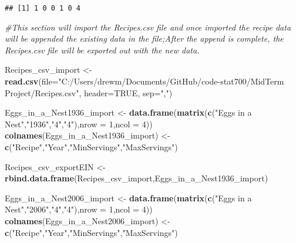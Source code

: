 \documentclass[]{article}
\newenvironment{Shaded}{\begin{snugshade}}{\end{snugshade}}
\newcommand{\KeywordTok}[1]{\textcolor[rgb]{0.13,0.29,0.53}{\textbf{#1}}}
\newcommand{\DataTypeTok}[1]{\textcolor[rgb]{0.13,0.29,0.53}{#1}}
\newcommand{\DecValTok}[1]{\textcolor[rgb]{0.00,0.00,0.81}{#1}}
\newcommand{\StringTok}[1]{\textcolor[rgb]{0.31,0.60,0.02}{#1}}
\newcommand{\CommentTok}[1]{\textcolor[rgb]{0.56,0.35,0.01}{\textit{#1}}}
\newcommand{\OtherTok}[1]{\textcolor[rgb]{0.56,0.35,0.01}{#1}}
\newcommand{\OperatorTok}[1]{\textcolor[rgb]{0.81,0.36,0.00}{\textbf{#1}}}
\newcommand{\NormalTok}[1]{#1}
\begin{document}
\begin{Shaded}
\end{Shaded}

\begin{verbatim}
## [1] 1 0 0 1 0 4
\end{verbatim}

\begin{Shaded}
\begin{Highlighting}[]
\CommentTok{#This section will import the Recipes.csv file and once imported the recipe data will be appended the existing data in the file;After the append is complete, the Recipes.csv file will be exported out with the new data.}

\NormalTok{Recipes_csv_import <-}\StringTok{ }\KeywordTok{read.csv}\NormalTok{(}\DataTypeTok{file=}\StringTok{"C:/Users/drewm/Documents/GitHub/code-stat700/MidTerm Project/Recipes.csv"}\NormalTok{, }\DataTypeTok{header=}\OtherTok{TRUE}\NormalTok{, }\DataTypeTok{sep=}\StringTok{","}\NormalTok{)}

\NormalTok{Eggs_in_a_Nest1936_import <-}\StringTok{ }\KeywordTok{data.frame}\NormalTok{(}\KeywordTok{matrix}\NormalTok{(}\KeywordTok{c}\NormalTok{(}\StringTok{"Eggs in a Nest"}\NormalTok{,}\StringTok{"1936"}\NormalTok{,}\StringTok{"4"}\NormalTok{,}\StringTok{"4"}\NormalTok{),}\DataTypeTok{nrow =} \DecValTok{1}\NormalTok{,}\DataTypeTok{ncol =} \DecValTok{4}\NormalTok{))}
\KeywordTok{colnames}\NormalTok{(Eggs_in_a_Nest1936_import) <-}\StringTok{ }\KeywordTok{c}\NormalTok{(}\StringTok{"Recipe"}\NormalTok{,}\StringTok{"Year"}\NormalTok{,}\StringTok{"MinServings"}\NormalTok{,}\StringTok{"MaxServings"}\NormalTok{)}

\NormalTok{Recipes_csv_exportEIN <-}\StringTok{ }\KeywordTok{rbind.data.frame}\NormalTok{(Recipes_csv_import,Eggs_in_a_Nest1936_import)}

\NormalTok{Eggs_in_a_Nest2006_import <-}\StringTok{ }\KeywordTok{data.frame}\NormalTok{(}\KeywordTok{matrix}\NormalTok{(}\KeywordTok{c}\NormalTok{(}\StringTok{"Eggs in a Nest"}\NormalTok{,}\StringTok{"2006"}\NormalTok{,}\StringTok{"4"}\NormalTok{,}\StringTok{"4"}\NormalTok{),}\DataTypeTok{nrow =} \DecValTok{1}\NormalTok{,}\DataTypeTok{ncol =} \DecValTok{4}\NormalTok{))}
\KeywordTok{colnames}\NormalTok{(Eggs_in_a_Nest2006_import) <-}\StringTok{ }\KeywordTok{c}\NormalTok{(}\StringTok{"Recipe"}\NormalTok{,}\StringTok{"Year"}\NormalTok{,}\StringTok{"MinServings"}\NormalTok{,}\StringTok{"MaxServings"}\NormalTok{)}


\end{Highlighting}
\end{Shaded}
\end{document}
